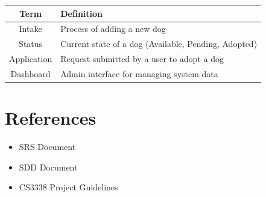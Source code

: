\documentclass[12pt]{article}
\begin{document}
\begin{longtable}{|c|p{8cm}|}
\hline
\textbf{Term} & \textbf{Definition} \\
\hline
Intake & Process of adding a new dog \\
\hline
Status & Current state of a dog (Available, Pending, Adopted) \\
\hline
Application & Request submitted by a user to adopt a dog \\
\hline
Dashboard & Admin interface for managing system data \\
\hline
\end{longtable}

\section{References}

\begin{itemize}
\item SRS Document
\item SDD Document
\item CS3338 Project Guidelines
\end{itemize}
\end{document}
